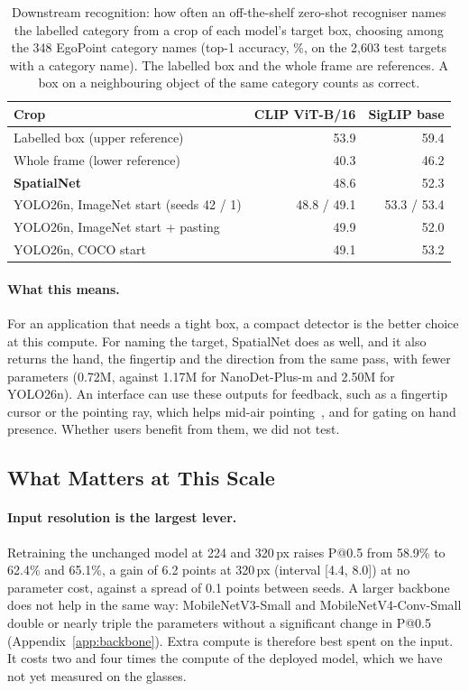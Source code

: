 \begin{table}[t]
  \caption{Downstream recognition: how often an off-the-shelf zero-shot recogniser names the labelled category from a crop of each model's target box, choosing among the 348 EgoPoint category names (top-1 accuracy, \%, on the 2,603 test targets with a category name). The labelled box and the whole frame are references. A box on a neighbouring object of the same category counts as correct.}
  \label{tab:recog}
  \footnotesize
  \begin{tabular}{lrr}
    \toprule
    Crop & CLIP ViT-B/16 & SigLIP base \\
    \midrule
    Labelled box (upper reference) & 53.9 & 59.4 \\
    Whole frame (lower reference) & 40.3 & 46.2 \\
    \midrule
    \textbf{SpatialNet} & 48.6 & 52.3 \\
    YOLO26n, ImageNet start (seeds 42 / 1) & 48.8 / 49.1 & 53.3 / 53.4 \\
    YOLO26n, ImageNet start + pasting & 49.9 & 52.0 \\
    YOLO26n, COCO start & 49.1 & 53.2 \\
    \bottomrule
  \end{tabular}
\end{table}

\paragraph{What this means.} For an application that needs a tight box, a compact detector is the better choice at this compute. For naming the target, SpatialNet does as well, and it also returns the hand, the fingertip and the direction from the same pass, with fewer parameters (0.72M, against 1.17M for NanoDet-Plus-m and 2.50M for YOLO26n). An interface can use these outputs for feedback, such as a fingertip cursor or the pointing ray, which helps mid-air pointing~\cite{mayer2018effect}, and for gating on hand presence. Whether users benefit from them, we did not test.

\subsection{What Matters at This Scale}\label{sec:design}

\paragraph{Input resolution is the largest lever.} Retraining the unchanged model at 224 and 320\,px raises P@0.5 from 58.9\% to 62.4\% and 65.1\%, a gain of 6.2 points at 320\,px (interval [4.4, 8.0]) at no parameter cost, against a spread of 0.1 points between seeds. A larger backbone does not help in the same way: MobileNetV3-Small and MobileNetV4-Conv-Small double or nearly triple the parameters without a significant change in P@0.5 (Appendix~\ref{app:backbone}). Extra compute is therefore best spent on the input. It costs two and four times the compute of the deployed model, which we have not yet measured on the glasses.

